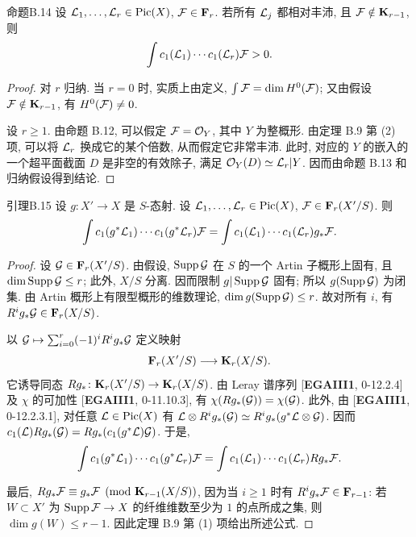 \begin{origstatement}{命题}{B.14}\label{appB:14}
设 $\mathcal L_1,\ldots,\mathcal L_r\in\operatorname{Pic}(X)$, $\mathcal F\in\mathbf F_r$. 若所有 $\mathcal L_j$ 都相对丰沛, 且 $\mathcal F\notin\mathbf K_{r-1}$, 则
\[\int c_1(\mathcal L_1)\cdots c_1(\mathcal L_r)\mathcal F>0.\]
\end{origstatement}
\begin{proof}
对 $r$ 归纳. 当 $r=0$ 时, 实质上由定义, $\int\mathcal F=\dim H^0(\mathcal F)$; 又由假设 $\mathcal F\notin\mathbf K_{r-1}$, 有 $H^0(\mathcal F)\ne0$.

设 $r\ge1$. 由命题 B.12, 可以假定 $\mathcal F=\mathcal O_Y$, 其中 $Y$ 为整概形. 由定理 B.9 第 (2) 项, 可以将 $\mathcal L_r$ 换成它的某个倍数, 从而假定它非常丰沛. 此时, 对应的 $Y$ 的嵌入的一个超平面截面 $D$ 是非空的有效除子, 满足 $\mathcal O_Y(D)\simeq\mathcal L_r|Y$. 因而由命题 B.13 和归纳假设得到结论.
\end{proof}

\begin{origstatement}{引理}{B.15}\label{appB:15}
设 $g\colon X'\to X$ 是 $S$-态射. 设 $\mathcal L_1,\ldots,\mathcal L_r\in\operatorname{Pic}(X)$, $\mathcal F\in\mathbf F_r(X'/S)$. 则
\[\int c_1(g^*\mathcal L_1)\cdots c_1(g^*\mathcal L_r)\mathcal F=\int c_1(\mathcal L_1)\cdots c_1(\mathcal L_r)g_*\mathcal F.\]
\end{origstatement}
\begin{proof}
设 $\mathcal G\in\mathbf F_r(X'/S)$. 由假设, $\operatorname{Supp}\mathcal G$ 在 $S$ 的一个 Artin 子概形上固有, 且 $\dim\operatorname{Supp}\mathcal G\le r$; 此外, $X/S$ 分离. 因而限制 $g|\operatorname{Supp}\mathcal G$ 固有; 所以 $g(\operatorname{Supp}\mathcal G)$ 为闭集. 由 Artin 概形上有限型概形的维数理论, $\dim g(\operatorname{Supp}\mathcal G)\le r$. 故对所有 $i$, 有 $R^ig_*\mathcal G\in\mathbf F_r(X/S)$.

以 $\mathcal G\mapsto\sum_{i=0}^r(-1)^iR^ig_*\mathcal G$ 定义映射
\[\mathbf F_r(X'/S)\longrightarrow\mathbf K_r(X/S).\]
它诱导同态 $Rg_*\colon\mathbf K_r(X'/S)\to\mathbf K_r(X/S)$. 由 Leray 谱序列 [\textbf{EGAIII1}, 0-12.2.4] 及 $\chi$ 的可加性 [\textbf{EGAIII1}, 0-11.10.3], 有 $\chi(Rg_*(\mathcal G))=\chi(\mathcal G)$. 此外, 由 [\textbf{EGAIII1}, 0-12.2.3.1], 对任意 $\mathcal L\in\operatorname{Pic}(X)$ 有 $\mathcal L\otimes R^ig_*(\mathcal G)\simeq R^ig_*(g^*\mathcal L\otimes\mathcal G)$. 因而 $c_1(\mathcal L)Rg_*(\mathcal G)=Rg_*(c_1(g^*\mathcal L)\mathcal G)$. 于是,
\[\int c_1(g^*\mathcal L_1)\cdots c_1(g^*\mathcal L_r)\mathcal F=\int c_1(\mathcal L_1)\cdots c_1(\mathcal L_r)Rg_*\mathcal F.\]

最后, $Rg_*\mathcal F\equiv g_*\mathcal F\pmod{\mathbf K_{r-1}(X/S)}$, 因为当 $i\ge1$ 时有 $R^ig_*\mathcal F\in\mathbf F_{r-1}$: 若 $W\subset X'$ 为 $\operatorname{Supp}\mathcal F\to X$ 的纤维维数至少为 $1$ 的点所成之集, 则 $\dim g(W)\le r-1$. 因此定理 B.9 第 (1) 项给出所述公式.
\end{proof}


